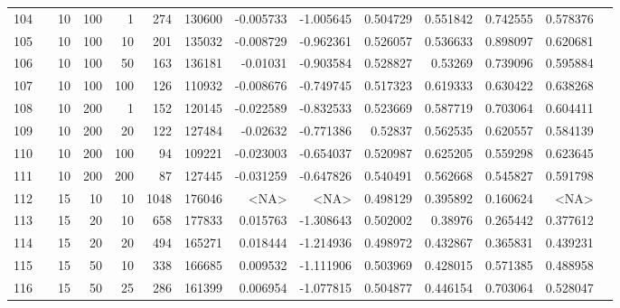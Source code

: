 \begin{longtable}{llrrrrrrrrrrrr}
		104 & &           10 &               100 &            1 &         274 &     130600 & -0.005733 & -1.005645 &  0.504729 &    0.551842 &       0.742555 &  0.578376 \\
		105 & &           10 &               100 &           10 &         201 &     135032 & -0.008729 & -0.962361 &  0.526057 &    0.536633 &       0.898097 &  0.620681 \\
		106 & &           10 &               100 &           50 &         163 &     136181 &  -0.01031 & -0.903584 &  0.528827 &     0.53269 &       0.739096 &  0.595884 \\
		107 & &           10 &               100 &          100 &         126 &     110932 & -0.008676 & -0.749745 &  0.517323 &    0.619333 &       0.630422 &  0.638268 \\
		108 & &           10 &               200 &            1 &         152 &     120145 & -0.022589 & -0.832533 &  0.523669 &    0.587719 &       0.703064 &  0.604411 \\
		109 & &           10 &               200 &           20 &         122 &     127484 &  -0.02632 & -0.771386 &   0.52837 &    0.562535 &       0.620557 &  0.584139 \\
		110 & &           10 &               200 &          100 &          94 &     109221 & -0.023003 & -0.654037 &  0.520987 &    0.625205 &       0.559298 &  0.623645 \\
		111 & &           10 &               200 &          200 &          87 &     127445 & -0.031259 & -0.647826 &  0.540491 &    0.562668 &       0.545827 &  0.591798 \\
		112 & &           15 &                10 &           10 &           1048 &     176046 &      <NA> &      <NA> &  0.498129 &    0.395892 &       0.160624 &  <NA> \\
		113 & &           15 &                20 &           10 &         658 &     177833 &  0.015763 & -1.308643 &  0.502002 &     0.38976 &       0.265442 &  0.377612 \\
		114 & &           15 &                20 &           20 &         494 &     165271 &  0.018444 & -1.214936 &  0.498972 &    0.432867 &       0.365831 &  0.439231 \\
		115 & &           15 &                50 &           10 &         338 &     166685 &  0.009532 & -1.111906 &  0.503969 &    0.428015 &       0.571385 &  0.488958 \\
		116 & &           15 &                50 &           25 &         286 &     161399 &  0.006954 & -1.077815 &  0.504877 &    0.446154 &       0.703064 &  0.528047 \\

\end{longtable}
